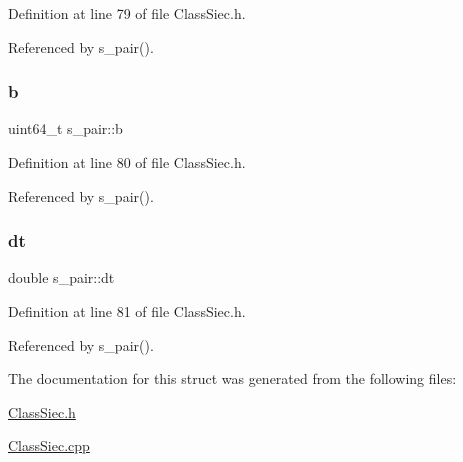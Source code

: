 Definition at line 79 of file Class\+Siec.\+h.



Referenced by s\+\_\+pair().

\mbox{\label{structs__pair_a4b452c86a4f4005ef2781e0324a50dda}} 
\subsubsection{\texorpdfstring{b}{b}}
{\footnotesize\ttfamily uint64\+\_\+t s\+\_\+pair\+::b}



Definition at line 80 of file Class\+Siec.\+h.



Referenced by s\+\_\+pair().

\mbox{\label{structs__pair_a6da5de6a04996b5b5c26be868da76900}} 
\subsubsection{\texorpdfstring{dt}{dt}}
{\footnotesize\ttfamily double s\+\_\+pair\+::dt}



Definition at line 81 of file Class\+Siec.\+h.



Referenced by s\+\_\+pair().



The documentation for this struct was generated from the following files\+:\begin{DoxyCompactItemize}
\item 
\mbox{\hyperlink{ClassSiec_8h}{Class\+Siec.\+h}}\item 
\mbox{\hyperlink{ClassSiec_8cpp}{Class\+Siec.\+cpp}}\end{DoxyCompactItemize}
